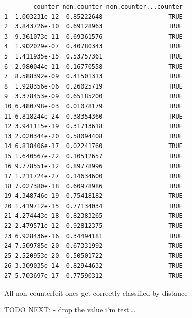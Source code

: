 \documentclass[
  letterpaper,
  DIV=11,
  numbers=noendperiod]{scrartcl}
\begin{document}
\begin{verbatim}
        counter non.counter non.counter...counter
1  1.003231e-12  0.85222648                  TRUE
2  3.843726e-10  0.69128963                  TRUE
3  9.361073e-11  0.69361576                  TRUE
4  1.902029e-07  0.40780343                  TRUE
5  1.411935e-15  0.53757361                  TRUE
6  2.980044e-11  0.16770558                  TRUE
7  8.588392e-09  0.41501313                  TRUE
8  1.928356e-06  0.26025719                  TRUE
9  3.378453e-09  0.65185200                  TRUE
10 6.480798e-03  0.01078179                  TRUE
11 6.818244e-24  0.38354360                  TRUE
12 3.941115e-19  0.31713618                  TRUE
13 2.020344e-20  0.58094408                  TRUE
14 6.818406e-17  0.02241760                  TRUE
15 1.640567e-22  0.10512657                  TRUE
16 9.778551e-12  0.89778996                  TRUE
17 1.211724e-27  0.14634600                  TRUE
18 7.027380e-18  0.60978986                  TRUE
19 4.348746e-19  0.75418182                  TRUE
20 1.419712e-15  0.77134034                  TRUE
21 4.274443e-18  0.82383265                  TRUE
22 2.479571e-12  0.92812375                  TRUE
23 6.928436e-16  0.34494181                  TRUE
24 7.509785e-20  0.67331992                  TRUE
25 2.520953e-20  0.50501722                  TRUE
26 3.309035e-14  0.82944632                  TRUE
27 5.703697e-17  0.77590312                  TRUE
\end{verbatim}

All non-counterfeit ones get correctly classified by distance

TODO NEXT: - drop the value i'm test\ldots.
\end{document}

